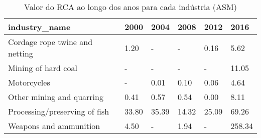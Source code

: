 \begin{table}
\centering
\caption{Valor do RCA ao longo dos anos para cada indústria (ASM)}
\begin{tabular}{p{6cm}p{1.5cm}p{1.5cm}p{1.5cm}p{1.5cm}p{1.5cm}}
\toprule
                 industry\_name &  2000 &  2004 &  2008 &  2012 &   2016 \\
\midrule
Cordage rope twine and netting &  1.20 &     - &     - &  0.16 &   5.62 \\
           Mining of hard coal &     - &     - &     - &     - &  11.05 \\
                   Motorcycles &     - &  0.01 &  0.10 &  0.06 &   4.64 \\
     Other mining and quarring &  0.41 &  0.57 &  0.54 &  0.00 &   8.11 \\
 Processing/preserving of fish & 33.80 & 35.39 & 14.32 & 25.09 &  69.26 \\
        Weapons and ammunition &  4.50 &     - &  1.94 &     - & 258.34 \\
\bottomrule
\end{tabular}
\end{table}
